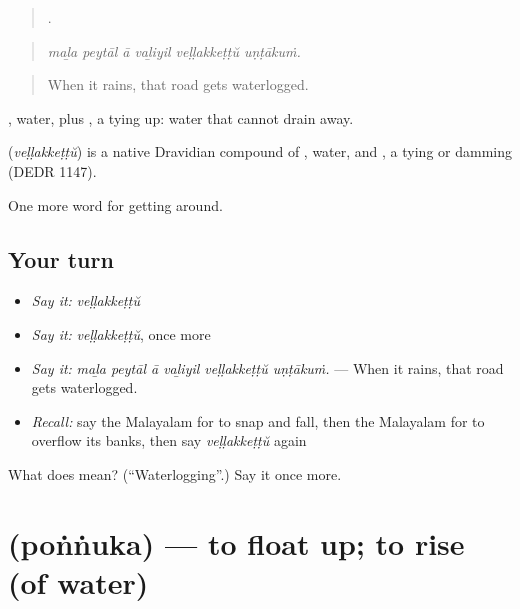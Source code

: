 \begin{quote}
     .
\end{quote}

\begin{quote}
\emph{maḻa peytāl ā vaḻiyil veḷḷakkeṭṭŭ uṇṭākuṁ.}
\end{quote}

\begin{quote}
When it rains, that road gets waterlogged.
\end{quote}

, water, plus , a tying up: water that cannot drain away.

\begin{cousinweb}
\textbf{} (\emph{veḷḷakkeṭṭŭ}) is a native Dravidian compound of , water, and , a tying or damming (DEDR 1147).
\end{cousinweb}

\begin{grammarlens}[title={What you've built}]
One more word for getting around.
\end{grammarlens}

\subsection*{Your turn}
\begin{itemize}
\raggedright
  \item \emph{Say it:} \emph{veḷḷakkeṭṭŭ}
  \item \emph{Say it:} \emph{veḷḷakkeṭṭŭ}, once more
  \item \emph{Say it:} \emph{maḻa peytāl ā vaḻiyil veḷḷakkeṭṭŭ uṇṭākuṁ.} — When it rains, that road gets waterlogged.
  \item \emph{Recall:} say the Malayalam for to snap and fall, then the Malayalam for to overflow its banks, then say \emph{veḷḷakkeṭṭŭ} again
\end{itemize}

\begin{tcolorbox}[breakable,colback=teal!4,colframe=teal!35!black,title={Before you move on}]
What does  mean? (\textquotedblleft{}Waterlogging\textquotedblright{}.) Say it once more.
\end{tcolorbox}
\section[\texorpdfstring{\ml{പൊങ്ങുക} (poṅṅuka)}{പൊങ്ങുക (poṅṅuka)}]{ (poṅṅuka) — to float up; to rise (of water)}


